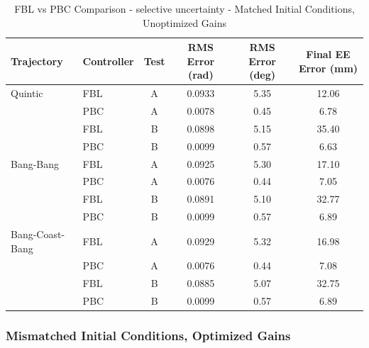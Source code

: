 \documentclass[11pt,a4paper]{article}
\begin{document}
\begin{table}[H]
\centering
\caption{FBL vs PBC Comparison - selective uncertainty - Matched Initial Conditions, Unoptimized Gains}
\begin{tabular}{llcccc}
\toprule
Trajectory & Controller & Test & RMS Error (rad) & RMS Error (deg) & Final EE Error (mm) \\
\midrule
Quintic & FBL & A & 0.0933 & 5.35 & 12.06 \\
 & PBC & A & \textcolor{bestcolor}{0.0078} & \textcolor{bestcolor}{0.45} & \textcolor{bestcolor}{6.78} \\
 & FBL & B & 0.0898 & 5.15 & 35.40 \\
 & PBC & B & \textcolor{bestcolor}{0.0099} & \textcolor{bestcolor}{0.57} & \textcolor{bestcolor}{6.63} \\
\midrule
Bang-Bang & FBL & A & 0.0925 & 5.30 & 17.10 \\
 & PBC & A & \textcolor{bestcolor}{0.0076} & \textcolor{bestcolor}{0.44} & \textcolor{bestcolor}{7.05} \\
 & FBL & B & 0.0891 & 5.10 & 32.77 \\
 & PBC & B & \textcolor{bestcolor}{0.0099} & \textcolor{bestcolor}{0.57} & \textcolor{bestcolor}{6.89} \\
\midrule
Bang-Coast-Bang & FBL & A & 0.0929 & 5.32 & 16.98 \\
 & PBC & A & \textcolor{bestcolor}{0.0076} & \textcolor{bestcolor}{0.44} & \textcolor{bestcolor}{7.08} \\
 & FBL & B & 0.0885 & 5.07 & 32.75 \\
 & PBC & B & \textcolor{bestcolor}{0.0099} & \textcolor{bestcolor}{0.57} & \textcolor{bestcolor}{6.89} \\
\bottomrule
\end{tabular}
\end{table}

\subsubsection{Mismatched Initial Conditions, Optimized Gains}
\end{document}
